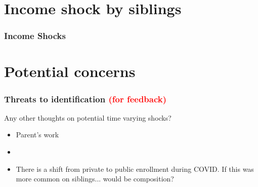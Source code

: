 \documentclass{beamer}
\begin{document}
\section{Income shock by siblings}


\begin{frame}
    \label{frame:incomeshocks_siblings}
    \frametitle{Income Shocks}
     

     {
    }

 \begin{flushleft}
        \hyperlink{frame:incomeshocks}{}
    \end{flushleft}   
    
    
\end{frame}


\section{Potential concerns}

\begin{frame}
    \label{frame:research_feedback}
    \frametitle{Threats to identification \textcolor{red}{(for feedback)}}
        Any other thoughts on potential time varying shocks?
        \begin{itemize}
            \item Parent's work
            \item 
            \item There is a shift from private to public enrollment during COVID. If this was more common on siblings... would be composition?
        \end{itemize}

 
    \begin{flushleft}
        \hyperlink{frame:research}{}
    \end{flushleft}
    
\end{frame}
\end{document}
